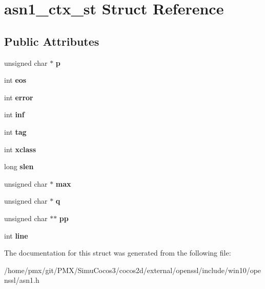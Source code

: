 \hypertarget{structasn1__ctx__st}{}\section{asn1\+\_\+ctx\+\_\+st Struct Reference}
\label{structasn1__ctx__st}
\subsection*{Public Attributes}
\begin{DoxyCompactItemize}
\item 
\mbox{\label{structasn1__ctx__st_a4055e8e978696b3ebe48663e27aaccfd}} 
unsigned char $\ast$ {\bfseries p}
\item 
\mbox{\label{structasn1__ctx__st_acfa7be33fd2e45713f6ae576c929c8fc}} 
int {\bfseries eos}
\item 
\mbox{\label{structasn1__ctx__st_ad615bc5c2f51b7b53714efab6848410e}} 
int {\bfseries error}
\item 
\mbox{\label{structasn1__ctx__st_a3c7aed3d59e1266f44363d75532b3c37}} 
int {\bfseries inf}
\item 
\mbox{\label{structasn1__ctx__st_a50c207efa22cdc9e926f70c3e05ebd8b}} 
int {\bfseries tag}
\item 
\mbox{\label{structasn1__ctx__st_a13d5a9bd152573c46b088acac3f7671f}} 
int {\bfseries xclass}
\item 
\mbox{\label{structasn1__ctx__st_ae23813e92662ef3caff611c92fe51879}} 
long {\bfseries slen}
\item 
\mbox{\label{structasn1__ctx__st_a22989e6f8850b237b7982c8f1c3f27a1}} 
unsigned char $\ast$ {\bfseries max}
\item 
\mbox{\label{structasn1__ctx__st_a2b0e6ae963399039db4a27f09ade7e41}} 
unsigned char $\ast$ {\bfseries q}
\item 
\mbox{\label{structasn1__ctx__st_a1f8419ae235a22405868d87136f3b098}} 
unsigned char $\ast$$\ast$ {\bfseries pp}
\item 
\mbox{\label{structasn1__ctx__st_adc9183c7070fe39aeff12711311c76b4}} 
int {\bfseries line}
\end{DoxyCompactItemize}


The documentation for this struct was generated from the following file\+:\begin{DoxyCompactItemize}
\item 
/home/pmx/git/\+P\+M\+X/\+Simu\+Cocos3/cocos2d/external/openssl/include/win10/openssl/asn1.\+h\end{DoxyCompactItemize}
